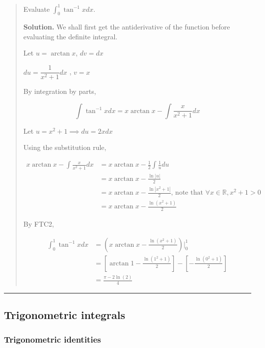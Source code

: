 \documentclass[
]{article}
\begin{document}
\begin{quote}
Evaluate \(\displaystyle \int_0^1 \tan^{-1}x dx\).

\textbf{Solution.} We shall first get the antiderivative of the function
before evaluating the definite integral.

Let \(u = \arctan x\), \(dv = dx\)

\(du = \dfrac{1}{x^2+1}dx\) , \(v = x\)

By integration by parts,

\[ \int \tan^{-1}x dx = x\arctan x - \int \frac{x}{x^2+1}dx \]

Let \(u = x^2 + 1 \implies du = 2xdx\)

Using the substitution rule,

\begin{align*}
x\arctan x - \int \frac{x}{x^2+1}dx &= x\arctan x - \frac{1}{2}\int \frac{1}{u}du\\
&= x\arctan x - \frac{\ln |u|}{2}\\
&= x\arctan x - \frac{\ln |x^2+1|}{2}\text{, note that }\forall x \in \mathbb{R}, x^2+1 > 0 \\
&= x\arctan x - \frac{\ln (x^2+1)}{2}
\end{align*}

By FTC2,

\begin{align*}
\int_0^1 \tan^{-1}x dx &= (x\arctan x - \frac{\ln (x^2+1)}{2}) |_0^1\\
&= [\arctan 1 - \frac{\ln (1^2+1)}{2}] - [ - \frac{\ln (0^2+1)}{2}]\\
&= \frac{\pi - 2\ln(2)}{4}
\end{align*}
\end{quote}

\begin{center}\rule{0.5\linewidth}{0.5pt}\end{center}

\hypertarget{trigonometric-integrals}{%
\subsection{Trigonometric integrals}\label{trigonometric-integrals}}

\hypertarget{trigonometric-identities}{%
\subsubsection{Trigonometric
identities}\label{trigonometric-identities}}
\end{document}
